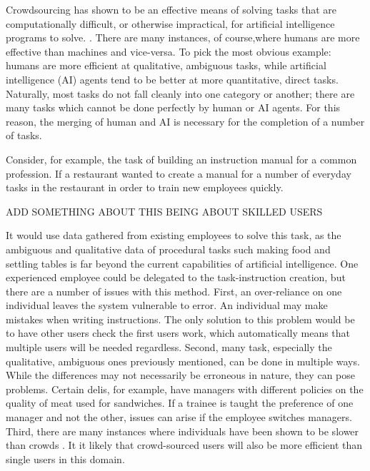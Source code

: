 Crowdsourcing has shown to be an effective means of solving tasks that are computationally difficult, or otherwise impractical, for artificial intelligence programs to solve. \cite{howie2006rise}. 
There are many instances, of course,where humans are more effective than machines and vice-versa. 
To pick the most obvious example: humans are more efficient at qualitative, ambiguous tasks, while artificial intelligence (AI) agents tend to be better at more quantitative, direct tasks.
Naturally, most tasks do not fall cleanly into one category or another; there are many tasks which cannot be done perfectly by human or AI agents. 
For this reason, the merging of human and AI is necessary for the completion of a number of tasks.

Consider, for example, the task of building an instruction manual for a common profession. 
If a restaurant wanted to create a manual for a number of everyday tasks in the restaurant in order to train new employees quickly.

ADD SOMETHING ABOUT THIS BEING ABOUT SKILLED USERS

It would use data gathered from existing employees to solve this task, as the ambiguous and qualitative data of procedural tasks such making food and settling tables is far beyond the current capabilities of artificial intelligence.
One experienced employee could be delegated to the task-instruction creation, but there are a number of issues with this method.
First, an over-reliance on one individual leaves the system vulnerable to error.
An individual may make mistakes when writing instructions.
The only solution to this problem would be to have other users check the first users work, which automatically means that multiple users will be needed regardless.
Second, many task, especially the qualitative, ambiguous ones previously mentioned, can be done in multiple ways.
While the differences may not necessarily be erroneous in nature, they can pose problems.
Certain delis, for example, have managers with different policies on the quality of meat used for sandwiches.
If a trainee is taught the preference of one manager and not the other, issues can arise if the employee switches managers.
Third, there are many instances where individuals have been shown to be slower than crowds \cite{lasecki2013interactive,}.
It it likely that crowd-sourced users will also be more efficient than single users in this domain.

